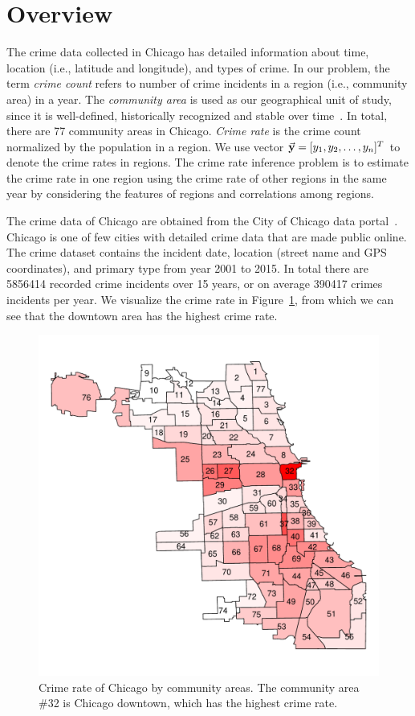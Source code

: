 
\section{Overview}
\label{ch5-sec:overview}
The crime data collected in Chicago has detailed information about time, location (i.e., latitude and longitude), and types of crime. In our problem, the term \emph{crime count} refers to number of crime incidents in a region (i.e., community area) in a year. The \emph{community area} is used as our geographical unit of study, since it is well-defined,  historically recognized and stable over time~\cite{SrGc09}. In total, there are 77 community areas in Chicago.  \emph{Crime rate} is the crime count normalized by the population in a region. We use vector $\vec{\mathbf{y}} = [y_1, y_2, \ldots, y_n]^T$ to denote the crime rates in regions. The crime rate inference problem is to estimate the crime rate in one region using the crime rate of other regions in the same year by considering the features of regions and correlations among regions. 


The crime data of Chicago are obtained from the City of Chicago data portal~\cite{crime-data}. Chicago is one of few cities with detailed crime data that are made public online. The crime dataset contains the incident date, location (street name and GPS coordinates), and primary type from year 2001 to 2015. In total there are \num{5856414} recorded crime incidents over 15 years, or on average \num{390417} crimes incidents per year. We visualize the crime rate in Figure~\ref{fig:crime-ca}, from which we can see that the downtown area has the highest crime rate.

\begin{figure}[t]
\centering
\includegraphics[width=0.6\linewidth]{fig/crime-ca.pdf}
\caption{Crime rate of Chicago by community areas. The community area \#32 is Chicago downtown, which has the highest crime rate.}
\label{fig:crime-ca}
\end{figure}


